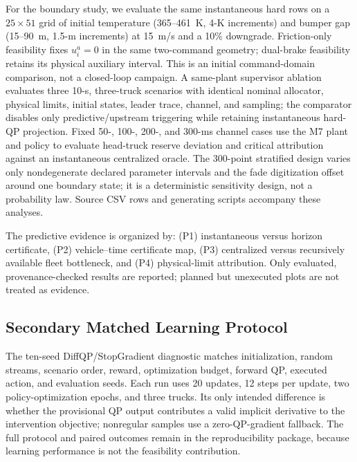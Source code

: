 For the boundary study, we evaluate the same instantaneous hard rows on a $25\times51$ grid of initial temperature (365--461~K, 4-K increments) and bumper gap (15--90~m, 1.5-m increments) at 15~m/s and a 10\% downgrade. Friction-only feasibility fixes $u_i^a=0$ in the same two-command geometry; dual-brake feasibility retains its physical auxiliary interval. This is an initial command-domain comparison, not a closed-loop campaign. A same-plant supervisor ablation evaluates three 10-s, three-truck scenarios with identical nominal allocator, physical limits, initial states, leader trace, channel, and sampling; the comparator disables only predictive/upstream triggering while retaining instantaneous hard-QP projection. Fixed 50-, 100-, 200-, and 300-ms channel cases use the M7 plant and policy to evaluate head-truck reserve deviation and critical attribution against an instantaneous centralized oracle. The 300-point stratified design varies only nondegenerate declared parameter intervals and the fade digitization offset around one boundary state; it is a deterministic sensitivity design, not a probability law. Source CSV rows and generating scripts accompany these analyses.

The predictive evidence is organized by: (P1) instantaneous versus horizon certificate, (P2) vehicle--time certificate map, (P3) centralized versus recursively available fleet bottleneck, and (P4) physical-limit attribution. Only evaluated, provenance-checked results are reported; planned but unexecuted plots are not treated as evidence.

\subsection{Secondary Matched Learning Protocol}
The ten-seed DiffQP/StopGradient diagnostic matches initialization, random streams, scenario order, reward, optimization budget, forward QP, executed action, and evaluation seeds. Each run uses 20 updates, 12 steps per update, two policy-optimization epochs, and three trucks. Its only intended difference is whether the provisional QP output contributes a valid implicit derivative to the intervention objective; nonregular samples use a zero-QP-gradient fallback. The full protocol and paired outcomes remain in the reproducibility package, because learning performance is not the feasibility contribution.


